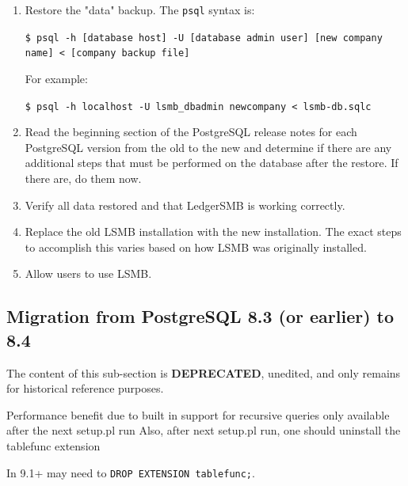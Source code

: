\begin{enumerate}
        
        \texttt{\$ psql -h [database host] -U [database admin user] -c 'CREATE DATABASE [new company name]'}
        
        For example:
        
        \texttt{\$ psql -h localhost -U lsmb\_dbadmin -c 'CREATE DATABASE newcompany'}
    \item Restore the "data" backup. The \texttt{psql} syntax is:
    
        \texttt{\$ psql -h [database host] -U [database admin user] [new company name] < [company backup file]}
        
        For example:
        
        \texttt{\$ psql -h localhost -U lsmb\_dbadmin newcompany < lsmb-db.sqlc}
    \item Read the beginning section of the PostgreSQL release notes for each PostgreSQL version from the old to the new and determine
        if there are any additional steps that must be performed on the database after the restore. 
        If there are, do them now.
    \item Verify all data restored and that LedgerSMB is working correctly.
    \item Replace the old LSMB installation with the new installation. 
        The exact steps to accomplish this varies based on how LSMB was originally installed.
    \item Allow users to use LSMB.
\end{enumerate}

\subsection{Migration from PostgreSQL 8.3 (or earlier) to 8.4}
\label{subsec-migration-pre84-to84plus}

\vspace{5mm}
\begin{center}
\large{The content of this sub-section is \textbf{DEPRECATED}, unedited, and only remains for historical reference purposes.}
\end{center}
\vspace{5mm}

Performance benefit due to built in support for recursive queries only available
after the next setup.pl run
Also, after next setup.pl run, one should uninstall the tablefunc extension

In 9.1+ may need to \texttt{DROP EXTENSION tablefunc;}.

